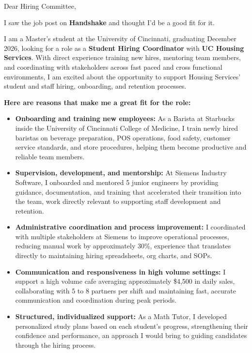 \documentclass[11pt]{letter}
\date{}
\begin{document}
\begin{letter}{}

\opening{Dear Hiring Committee,}

I saw the job post on \textbf{Handshake} and thought I'd be a good fit for it.

I am a Master's student at the University of Cincinnati, graduating December 2026, looking for a role as a \textbf{Student Hiring Coordinator} with \textbf{UC Housing Services}. With direct experience training new hires, mentoring team members, and coordinating with stakeholders across fast paced and cross functional environments, I am excited about the opportunity to support Housing Services' student and staff hiring, onboarding, and retention processes.

\textbf{Here are reasons that make me a great fit for the role:}

\begin{itemize}[leftmargin=*, itemsep=0.45em]
    \item \textbf{Onboarding and training new employees:} As a Barista at Starbucks inside the University of Cincinnati College of Medicine, I train newly hired baristas on beverage preparation, POS operations, food safety, customer service standards, and store procedures, helping them become productive and reliable team members.

    \item \textbf{Supervision, development, and mentorship:} At Siemens Industry Software, I onboarded and mentored 5 junior engineers by providing guidance, documentation, and training that accelerated their transition into the team, work directly relevant to supporting staff development and retention.

    \item \textbf{Administrative coordination and process improvement:} I coordinated with multiple stakeholders at Siemens to improve operational processes, reducing manual work by approximately 30\%, experience that translates directly to maintaining hiring spreadsheets, org charts, and SOPs.

    \item \textbf{Communication and responsiveness in high volume settings:} I support a high volume cafe averaging approximately \$4,500 in daily sales, collaborating with 5 to 8 partners per shift and maintaining fast, accurate communication and coordination during peak periods.

    \item \textbf{Structured, individualized support:} As a Math Tutor, I developed personalized study plans based on each student's progress, strengthening their confidence and performance, an approach I would bring to guiding candidates through the hiring process.
\end{itemize}


\end{letter}
\end{document}
